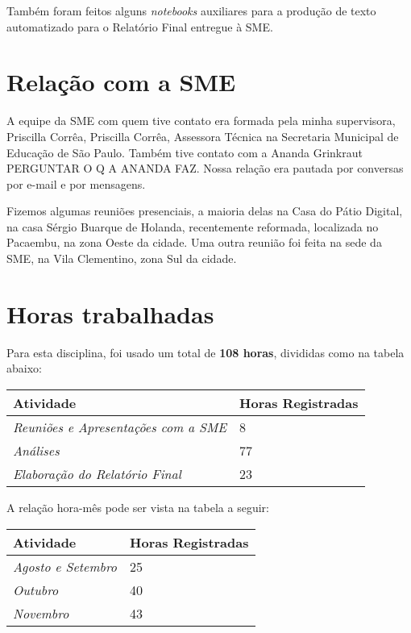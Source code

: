 \documentclass[12pt, a4paper]{article}
\begin{document}
Também foram feitos alguns \textit{notebooks} auxiliares para a produção de texto automatizado para o Relatório Final entregue à SME.

\section{Relação com a SME}

A equipe da SME com quem tive contato era formada pela minha supervisora, Priscilla Corrêa,  Priscilla Corrêa, Assessora Técnica na Secretaria Municipal de Educação de São Paulo. Também tive contato com a Ananda Grinkraut {\color{red} PERGUNTAR O Q A ANANDA FAZ}. Nossa relação era pautada por conversas por e-mail e por mensagens.

Fizemos algumas reuniões presenciais, a maioria delas na Casa do Pátio Digital, na casa Sérgio Buarque de Holanda, recentemente reformada, localizada no Pacaembu, na zona Oeste da cidade. Uma outra reunião foi feita na sede da SME, na Vila Clementino, zona Sul da cidade.

\section{Horas trabalhadas}

Para esta disciplina, foi usado um total de \textbf{108 horas}, divididas como na tabela abaixo:

\begin{table}[H]
	\centering
	\begin{tabular}{l|l}
		\textbf{Atividade}                                   & \textbf{Horas Registradas} \\ \hline
		\textit{Reuniões e Apresentações com a SME} & 8                          \\ \hline
		\textit{Análises}                           & 77                         \\ \hline
		\textit{Elaboração do Relatório Final}    & 23                         \\ 
	\end{tabular}
\end{table}

A relação hora-mês pode ser vista na tabela a seguir:

\begin{table}[H]
	\centering
	\begin{tabular}{l|l}
		\textbf{Atividade}                                   & \textbf{Horas Registradas} \\ \hline
		\textit{Agosto e Setembro} & 25                          \\ \hline
		\textit{Outubro}                           & 40                         \\ \hline
		\textit{Novembro}    & 43                         \\ 
	\end{tabular}
\end{table}
\end{document}
